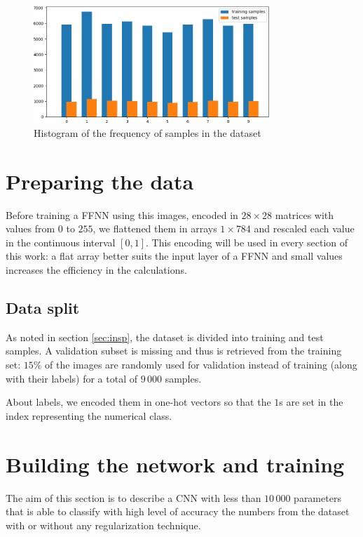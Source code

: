 \documentclass[compsoc]{IEEEtran}
\begin{document}
\begin{figure}[ht!]
\centering                                                                        
\includegraphics[width=3.5in]{hist.png}
\captionsetup{justification=centering}                                                                                         
\caption{Histogram of the frequency of samples in the dataset}
\label{fig:hist}                                                                                                                               
\end{figure}

\section{Preparing the data}
Before training a FFNN using this images, encoded in $28\times28$ matrices with values from $0$ to $255$, we flattened them in
arrays $1\times784$ and rescaled each value in the continuous interval $[0, 1]$. This encoding will be used in every section of this work: a flat array
better suits the input layer of a FFNN and small values increases the efficiency in the calculations.


\subsection{Data split}
As noted in section \ref{sec:insp}, the dataset is divided into training and test samples. A validation subset is missing and thus
is retrieved from the training set: $15\%$ of the images are randomly used for validation instead of training (along with their labels) for a total of $9\,000$ samples. \par
About labels, we encoded them in one-hot vectors so that the $1$s are set in the index representing the numerical class. \par

\section{Building the network and training}
The aim of this section is to describe a CNN with less than $10\,000$ parameters that is able to classify
with high level of accuracy the numbers from the dataset with or without any regularization technique. 
\end{document}
